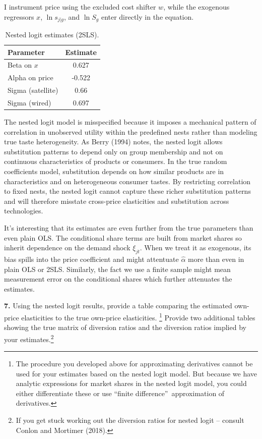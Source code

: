 \documentclass{article}
\begin{document}
I instrument price using the excluded cost shifter $w$, while the exogenous regressors $x$, $\ln s_{j|g}$, and $\ln S_g$ enter directly in the equation.

\begin{table}[H]
\centering
\caption{Nested logit estimates (2SLS).}
\begin{tabular}{lc}
\toprule
Parameter & Estimate\\
\midrule
Beta on $x$ & 0.627\\
Alpha on price & -0.522\\
Sigma (satellite) & 0.66\\
Sigma (wired) & 0.697\\
\bottomrule
\end{tabular}
\end{table}


The nested logit model is misspecified because it imposes a mechanical pattern of correlation in unobserved utility within the predefined nests rather than modeling true taste heterogeneity. As Berry (1994) notes, the nested logit allows substitution patterns to depend only on group membership and not on continuous characteristics of products or consumers. In the true random coefficients model, substitution depends on how similar products are in characteristics and on heterogeneous consumer tastes. By restricting correlation to fixed nests, the nested logit cannot capture these richer substitution patterns and will therefore misstate cross-price elasticities and substitution across technologies.

\vspace{5mm}

It's interesting that its estimates are even further from the true parameters than even plain OLS. The conditional share terms are built from market shares so inherit dependence on the demand shock $\xi_{jt}$. When we treat it as exogenous, its bias spills into the price coefficient and might attentuate $\hat\alpha$ more than even in plain OLS or 2SLS. Similarly, the fact we use a finite sample might mean measurement error on the conditional shares which further attenuates the estimates.


\begin{tcolorbox}
\textbf{7.} Using the nested logit results, provide a table comparing the
estimated own-price elasticities to the true own-price elasticities.%
\footnote{%
The procedure you developed above for approximating derivatives cannot be
used for your estimates based on the nested logit model. But because we have
analytic expressions for market shares in the nested logit model, you could
either differentiate these or use \textquotedblleft finite
difference\textquotedblright\ approximation of derivatives.} Provide two
additional tables showing the true matrix of diversion ratios and the
diversion ratios implied by your estimates.\footnote{If you get stuck working out the diversion ratios for nested logit -- consult Conlon and Mortimer (2018).}
\end{tcolorbox}
\end{document}
